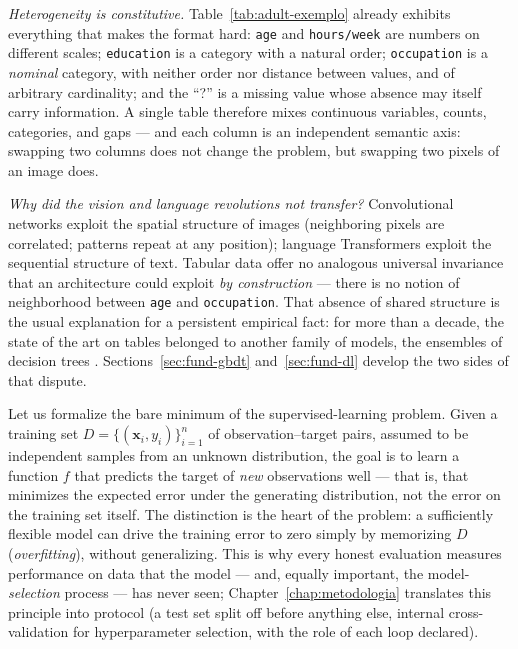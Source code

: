 \emph{Heterogeneity is constitutive.} Table~\ref{tab:adult-exemplo}
already exhibits everything that makes the format hard: \texttt{age}
and \texttt{hours/week} are numbers on different scales;
\texttt{education} is a category with a natural order;
\texttt{occupation} is a \emph{nominal} category, with neither order
nor distance between values, and of arbitrary cardinality; and the
``?'' is a missing value whose absence may itself carry information.
A single table therefore mixes continuous variables, counts,
categories, and gaps --- and each column is an independent semantic
axis: swapping two columns does not change the problem, but swapping
two pixels of an image does.

\emph{Why did the vision and language revolutions not transfer?}
Convolutional networks exploit the spatial structure of images
(neighboring pixels are correlated; patterns repeat at any position);
language Transformers exploit the sequential structure of text.
Tabular data offer no analogous universal invariance that an
architecture could exploit \emph{by construction} --- there is no
notion of neighborhood between \texttt{age} and \texttt{occupation}.
That absence of shared structure is the usual explanation for a
persistent empirical fact: for more than a decade, the state of the
art on tables belonged to another family of models, the ensembles of
decision trees \citep{grinsztajn2022}. Sections~\ref{sec:fund-gbdt}
and~\ref{sec:fund-dl} develop the two sides of that dispute.

Let us formalize the bare minimum of the supervised-learning
problem. Given a training set
$D = \{(\mathbf{x}_i, y_i)\}_{i=1}^{n}$ of observation--target pairs,
assumed to be independent samples from an unknown distribution, the
goal is to learn a function $f$ that predicts the target of \emph{new}
observations well --- that is, that minimizes the expected error under
the generating distribution, not the error on the training set itself.
The distinction is the heart of the problem: a sufficiently flexible
model can drive the training error to zero simply by memorizing $D$
(\emph{overfitting}), without generalizing. This is why every honest
evaluation measures performance on data that the model --- and,
equally important, the model-\emph{selection} process --- has never
seen; Chapter~\ref{chap:metodologia} translates this principle into
protocol (a test set split off before anything else, internal
cross-validation for hyperparameter selection, with the role of each
loop declared).

